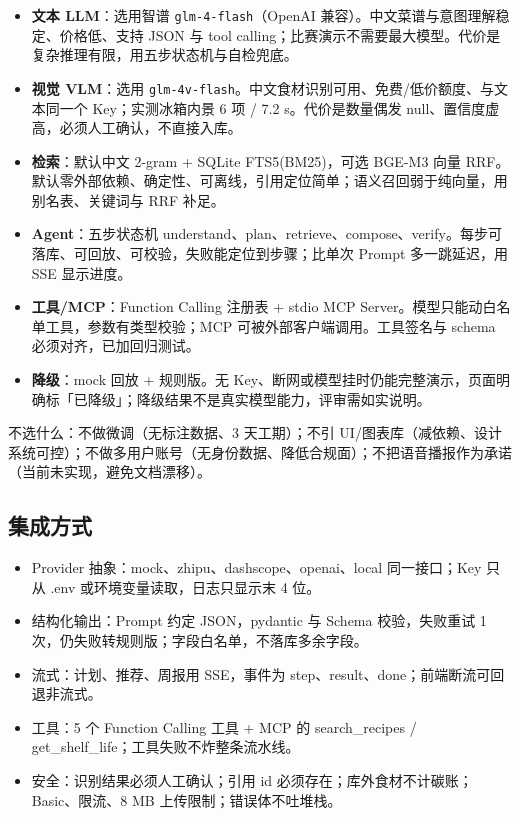 \begin{itemize}
\item \textbf{文本 LLM}：选用智谱 \texttt{glm-4-flash}（OpenAI 兼容）。中文菜谱与意图理解稳定、价格低、支持 JSON 与 tool calling；比赛演示不需要最大模型。代价是复杂推理有限，用五步状态机与自检兜底。
\item \textbf{视觉 VLM}：选用 \texttt{glm-4v-flash}。中文食材识别可用、免费/低价额度、与文本同一个 Key；实测冰箱内景 6 项 / 7.2 s。代价是数量偶发 null、置信度虚高，必须人工确认，不直接入库。
\item \textbf{检索}：默认中文 2-gram + SQLite FTS5(BM25)，可选 BGE-M3 向量 RRF。默认零外部依赖、确定性、可离线，引用定位简单；语义召回弱于纯向量，用别名表、关键词与 RRF 补足。
\item \textbf{Agent}：五步状态机 understand、plan、retrieve、compose、verify。每步可落库、可回放、可校验，失败能定位到步骤；比单次 Prompt 多一跳延迟，用 SSE 显示进度。
\item \textbf{工具/MCP}：Function Calling 注册表 + stdio MCP Server。模型只能动白名单工具，参数有类型校验；MCP 可被外部客户端调用。工具签名与 schema 必须对齐，已加回归测试。
\item \textbf{降级}：mock 回放 + 规则版。无 Key、断网或模型挂时仍能完整演示，页面明确标「已降级」；降级结果不是真实模型能力，评审需如实说明。
\end{itemize}

不选什么：不做微调（无标注数据、3 天工期）；不引 UI/图表库（减依赖、设计系统可控）；不做多用户账号（无身份数据、降低合规面）；不把语音播报作为承诺（当前未实现，避免文档漂移）。

\subsection{集成方式}

\begin{itemize}
\item Provider 抽象：mock、zhipu、dashscope、openai、local 同一接口；Key 只从 .env 或环境变量读取，日志只显示末 4 位。
\item 结构化输出：Prompt 约定 JSON，pydantic 与 Schema 校验，失败重试 1 次，仍失败转规则版；字段白名单，不落库多余字段。
\item 流式：计划、推荐、周报用 SSE，事件为 step、result、done；前端断流可回退非流式。
\item 工具：5 个 Function Calling 工具 + MCP 的 search\_recipes / get\_shelf\_life；工具失败不炸整条流水线。
\item 安全：识别结果必须人工确认；引用 id 必须存在；库外食材不计碳账；Basic、限流、8 MB 上传限制；错误体不吐堆栈。
\end{itemize}

